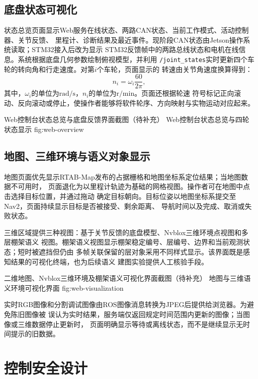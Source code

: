 \subsection{底盘状态可视化}

状态总览页面显示Web服务在线状态、两路CAN状态、当前工作模式、活动控制器、关节反馈、
里程计、诊断结果及最近事件。现阶段CAN状态由Jetson操作系统读取；STM32接入后改为显示
STM32反馈帧中的两路总线状态和电机在线信息。系统根据底盘几何参数绘制俯视模型，并利用
\texttt{/joint\_states}实时更新四个车轮的转向角和行走速度。对第$i$个车轮，页面显示的
转速由关节角速度换算得到：
\begin{equation}
    n_i=\omega_i\frac{60}{2\pi},
    \label{eq:web-rpm-display}
\end{equation}
其中，$\omega_i$的单位为$\mathrm{rad/s}$，$n_i$的单位为$\mathrm{r/min}$。页面还根据轮速
符号标记正向滚动、反向滚动或停止，使操作者能够将软件轮序、方向映射与实物运动对应起来。

\placeholderfigure{6.5cm}
{Web控制台状态总览与底盘反馈界面截图（待补充）}
{Web控制台状态总览与四轮状态显示}
{fig:web-overview}

\subsection{地图、三维环境与语义对象显示}

地图页面优先显示RTAB-Map发布的占据栅格和地图坐标系定位结果；当地图数据不可用时，
页面退化为以里程计轨迹为基础的网格视图。操作者可在地图中点击选择目标位置，并通过拖动
确定目标朝向。目标位姿以地图坐标系提交至Nav2，页面持续显示目标是否被接受、剩余距离、
导航时间以及完成、取消或失败状态。

三维区域提供三种视图：基于关节反馈的底盘模型、Nvblox三维环境点视图和多层棚架语义
视图。棚架语义视图显示棚架稳定编号、层编号、边界和当前观测状态；短时被遮挡但仍由
多帧关联保留的层对象采用不同样式显示。该界面既是感知结果的可视化终端，也为后续语义
建图实验提供人工核验手段。

\placeholderfigure{6.5cm}
{二维地图、Nvblox三维环境及棚架语义可视化界面截图（待补充）}
{地图与三维语义环境可视化界面}
{fig:web-visualization}

实时RGB图像和分割调试图像由ROS图像消息转换为JPEG后提供给浏览器。为避免陈旧图像被
误认为实时结果，服务端仅返回规定时间范围内更新的图像；当图像或三维数据停止更新时，
页面明确显示等待或离线状态，而不是继续显示无时间提示的旧数据。

\section{控制安全设计}

